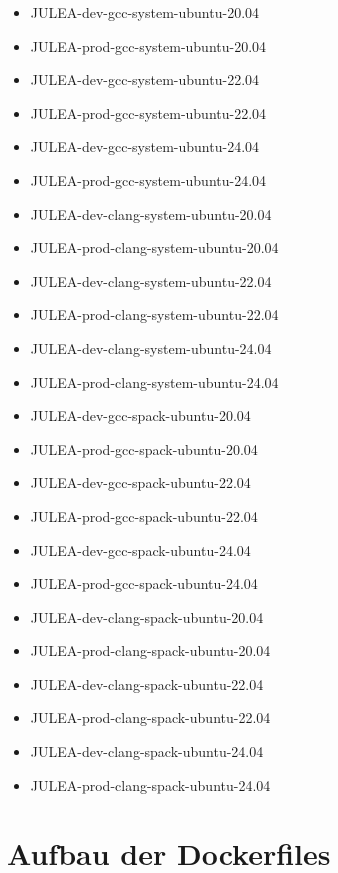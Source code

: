 \begin{multicols}{2}
    \begin{itemize}
        \item JULEA-dev-gcc-system-ubuntu-20.04  
        \item JULEA-prod-gcc-system-ubuntu-20.04  
        \item JULEA-dev-gcc-system-ubuntu-22.04  
        \item JULEA-prod-gcc-system-ubuntu-22.04  
        \item JULEA-dev-gcc-system-ubuntu-24.04  
        \item JULEA-prod-gcc-system-ubuntu-24.04  
        \item JULEA-dev-clang-system-ubuntu-20.04
        \item JULEA-prod-clang-system-ubuntu-20.04
        \item JULEA-dev-clang-system-ubuntu-22.04
        \item JULEA-prod-clang-system-ubuntu-22.04
        \item JULEA-dev-clang-system-ubuntu-24.04
        \item JULEA-prod-clang-system-ubuntu-24.04
        \item JULEA-dev-gcc-spack-ubuntu-20.04   
        \item JULEA-prod-gcc-spack-ubuntu-20.04   
        \item JULEA-dev-gcc-spack-ubuntu-22.04   
        \item JULEA-prod-gcc-spack-ubuntu-22.04   
        \item JULEA-dev-gcc-spack-ubuntu-24.04   
        \item JULEA-prod-gcc-spack-ubuntu-24.04   
        \item JULEA-dev-clang-spack-ubuntu-20.04 
        \item JULEA-prod-clang-spack-ubuntu-20.04 
        \item JULEA-dev-clang-spack-ubuntu-22.04 
        \item JULEA-prod-clang-spack-ubuntu-22.04 
        \item JULEA-dev-clang-spack-ubuntu-24.04 
        \item JULEA-prod-clang-spack-ubuntu-24.04 
    \end{itemize} 
\end{multicols}

\section{Aufbau der Dockerfiles}

